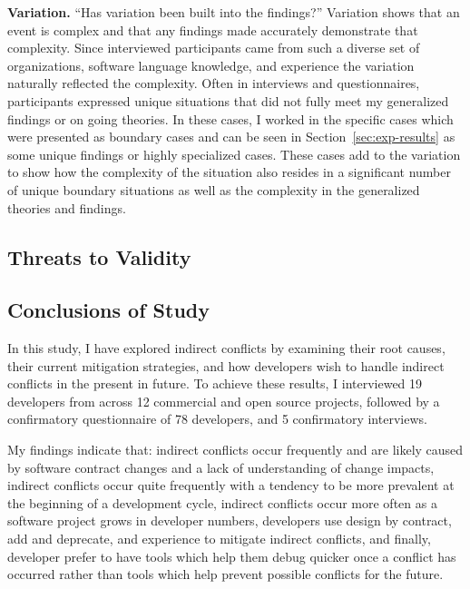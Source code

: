 {\bfseries Variation.} ``Has variation been built into the findings?'' Variation shows that an event is complex and that any findings
made accurately demonstrate that complexity. Since interviewed participants came from such a diverse set of organizations, 
software language knowledge, and experience the variation naturally reflected the complexity. Often in interviews and questionnaires, participants
expressed unique situations that did not fully meet my generalized findings or on going theories. In these cases, I worked in the specific
cases which were presented as boundary cases and can be seen in Section~\ref{sec:exp-results} as some unique findings or highly
specialized cases. These cases add to the variation
to show how the complexity of the situation also resides in a significant number of unique boundary situations as well as the complexity
in the generalized theories and findings.

\subsection{Threats to Validity}

\subsection{Conclusions of Study}

In this study, I have explored indirect conflicts by examining their root causes, their current mitigation strategies, and how developers
wish to handle indirect conflicts in the present in future. To achieve these results, I interviewed 19 developers from across 12 commercial 
and open source projects, followed by a confirmatory questionnaire of 78 developers, and 5 confirmatory interviews.

My findings indicate that: 
indirect conflicts occur frequently and are likely caused by software contract changes and a lack of understanding of change impacts,
indirect conflicts occur quite frequently with a tendency to be more prevalent at the beginning of a development cycle, indirect conflicts
occur more often as a software project grows in developer numbers, developers use design by contract, add and deprecate, and experience
to mitigate indirect conflicts, and finally, developer prefer to have tools which help them debug quicker once a conflict has occurred rather
than tools which help prevent possible conflicts for the future.
